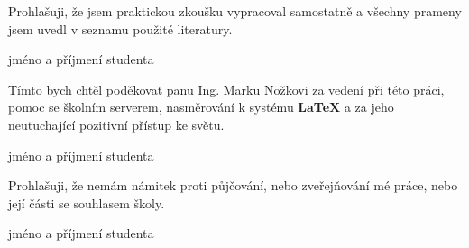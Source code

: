 
\newenvironment{signaturedtext}{}{%
	\newline
    \begin{flushright}
		\begin{minipage}[H]{.5\textwidth}
			\begin{center}
				\dotfill\newline
				jméno a příjmení studenta
			\end{center}		
		\end{minipage}
	\end{flushright}
}

\clearpage
\thispagestyle{empty}

\begin{signaturedtext}
	Prohlašuji, že jsem praktickou zkoušku vypracoval samostatně a všechny prameny jsem uvedl v seznamu použité literatury.
\end{signaturedtext}

\vspace*{\fill}

\begin{signaturedtext}
	Tímto bych chtěl poděkovat panu Ing. Marku Nožkovi za vedení při této práci, pomoc se školním serverem, nasměrování k systému \textbf{\LaTeX} a za jeho neutuchající pozitivní přístup ke světu.
\end{signaturedtext}
	
\vfill
	
\begin{signaturedtext}
	Prohlašuji, že nemám námitek proti půjčování, nebo zveřejňování mé práce, nebo její části se souhlasem školy.
\end{signaturedtext}

\clearpage